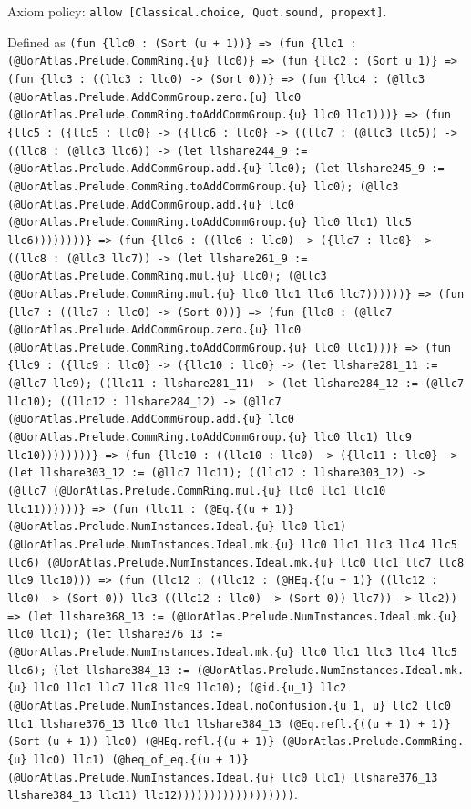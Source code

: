 \documentclass[11pt]{article}
\begin{document}
\noindent Axiom policy: \texttt{allow [Classical.choice, Quot.sound, propext]}.\par
\noindent Defined as \texttt{(fun \{llc0 : (Sort (u + 1))\} => (fun \{llc1 : (@UorAtlas.Prelude.CommRing.\{u\} llc0)\} => (fun \{llc2 : (Sort u\_1)\} => (fun \{llc3 : ((llc3 : llc0) -> (Sort 0))\} => (fun \{llc4 : (@llc3 (@UorAtlas.Prelude.AddCommGroup.zero.\{u\} llc0 (@UorAtlas.Prelude.CommRing.toAddCommGroup.\{u\} llc0 llc1)))\} => (fun \{llc5 : (\{llc5 : llc0\} -> (\{llc6 : llc0\} -> ((llc7 : (@llc3 llc5)) -> ((llc8 : (@llc3 llc6)) -> (let llshare244\_9 := (@UorAtlas.Prelude.AddCommGroup.add.\{u\} llc0); (let llshare245\_9 := (@UorAtlas.Prelude.CommRing.toAddCommGroup.\{u\} llc0); (@llc3 (@UorAtlas.Prelude.AddCommGroup.add.\{u\} llc0 (@UorAtlas.Prelude.CommRing.toAddCommGroup.\{u\} llc0 llc1) llc5 llc6))))))))\} => (fun \{llc6 : ((llc6 : llc0) -> (\{llc7 : llc0\} -> ((llc8 : (@llc3 llc7)) -> (let llshare261\_9 := (@UorAtlas.Prelude.CommRing.mul.\{u\} llc0); (@llc3 (@UorAtlas.Prelude.CommRing.mul.\{u\} llc0 llc1 llc6 llc7))))))\} => (fun \{llc7 : ((llc7 : llc0) -> (Sort 0))\} => (fun \{llc8 : (@llc7 (@UorAtlas.Prelude.AddCommGroup.zero.\{u\} llc0 (@UorAtlas.Prelude.CommRing.toAddCommGroup.\{u\} llc0 llc1)))\} => (fun \{llc9 : (\{llc9 : llc0\} -> (\{llc10 : llc0\} -> (let llshare281\_11 := (@llc7 llc9); ((llc11 : llshare281\_11) -> (let llshare284\_12 := (@llc7 llc10); ((llc12 : llshare284\_12) -> (@llc7 (@UorAtlas.Prelude.AddCommGroup.add.\{u\} llc0 (@UorAtlas.Prelude.CommRing.toAddCommGroup.\{u\} llc0 llc1) llc9 llc10))))))))\} => (fun \{llc10 : ((llc10 : llc0) -> (\{llc11 : llc0\} -> (let llshare303\_12 := (@llc7 llc11); ((llc12 : llshare303\_12) -> (@llc7 (@UorAtlas.Prelude.CommRing.mul.\{u\} llc0 llc1 llc10 llc11))))))\} => (fun (llc11 : (@Eq.\{(u + 1)\} (@UorAtlas.Prelude.NumInstances.Ideal.\{u\} llc0 llc1) (@UorAtlas.Prelude.NumInstances.Ideal.mk.\{u\} llc0 llc1 llc3 llc4 llc5 llc6) (@UorAtlas.Prelude.NumInstances.Ideal.mk.\{u\} llc0 llc1 llc7 llc8 llc9 llc10))) => (fun (llc12 : ((llc12 : (@HEq.\{(u + 1)\} ((llc12 : llc0) -> (Sort 0)) llc3 ((llc12 : llc0) -> (Sort 0)) llc7)) -> llc2)) => (let llshare368\_13 := (@UorAtlas.Prelude.NumInstances.Ideal.mk.\{u\} llc0 llc1); (let llshare376\_13 := (@UorAtlas.Prelude.NumInstances.Ideal.mk.\{u\} llc0 llc1 llc3 llc4 llc5 llc6); (let llshare384\_13 := (@UorAtlas.Prelude.NumInstances.Ideal.mk.\{u\} llc0 llc1 llc7 llc8 llc9 llc10); (@id.\{u\_1\} llc2 (@UorAtlas.Prelude.NumInstances.Ideal.noConfusion.\{u\_1, u\} llc2 llc0 llc1 llshare376\_13 llc0 llc1 llshare384\_13 (@Eq.refl.\{((u + 1) + 1)\} (Sort (u + 1)) llc0) (@HEq.refl.\{(u + 1)\} (@UorAtlas.Prelude.CommRing.\{u\} llc0) llc1) (@heq\_of\_eq.\{(u + 1)\} (@UorAtlas.Prelude.NumInstances.Ideal.\{u\} llc0 llc1) llshare376\_13 llshare384\_13 llc11) llc12))))))))))))))))))}.\par
\end{document}
